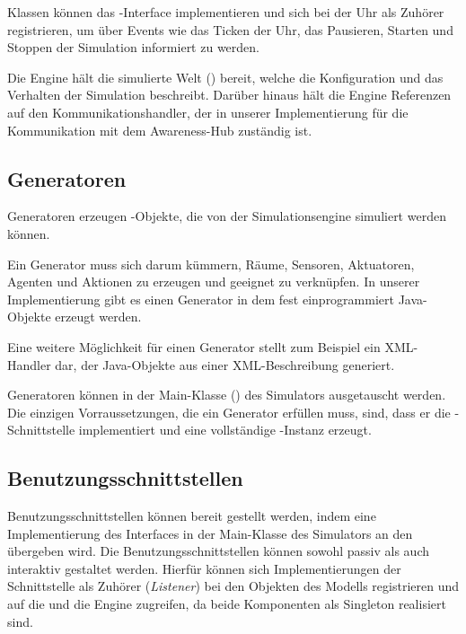 Klassen können das -Interface implementieren und sich bei der Uhr als Zuhörer registrieren, um über Events wie das Ticken der Uhr, das Pausieren, Starten und Stoppen der Simulation informiert zu werden.

Die Engine hält die simulierte Welt () bereit, welche die Konfiguration und das Verhalten der Simulation beschreibt. Darüber hinaus hält die Engine Referenzen auf den Kommunikationshandler, der in unserer Implementierung für die Kommunikation mit dem Awareness-Hub zuständig ist.

\subsection{Generatoren}\label{subsec:concept_generators}
Generatoren erzeugen -Objekte, die von der Simulationsengine simuliert werden können.

Ein Generator muss sich darum kümmern, Räume, Sensoren, Aktuatoren, Agenten und Aktionen zu erzeugen und geeignet zu verknüpfen. In unserer Implementierung gibt es einen Generator in dem fest einprogrammiert Java-Objekte erzeugt werden.

Eine weitere Möglichkeit für einen Generator stellt zum Beispiel ein XML-Handler dar, der Java-Objekte aus einer XML-Beschreibung generiert.

Generatoren können in der Main-Klasse () des Simulators ausgetauscht werden. Die einzigen Vorraussetzungen, die ein Generator erfüllen muss, sind, dass er die -Schnittstelle implementiert und eine vollständige -Instanz erzeugt.


\subsection{Benutzungsschnittstellen}\label{subsec:concept_interfaces}
Benutzungsschnittstellen können bereit gestellt werden, indem eine Implementierung des Interfaces  in der Main-Klasse des Simulators an den  übergeben wird. Die Benutzungsschnittstellen können sowohl passiv als auch interaktiv gestaltet werden. Hierfür können sich Implementierungen der Schnittstelle als Zuhörer (\emph{Listener}) bei den Objekten des Modells registrieren und auf die  und die Engine zugreifen, da beide Komponenten als Singleton realisiert sind.

